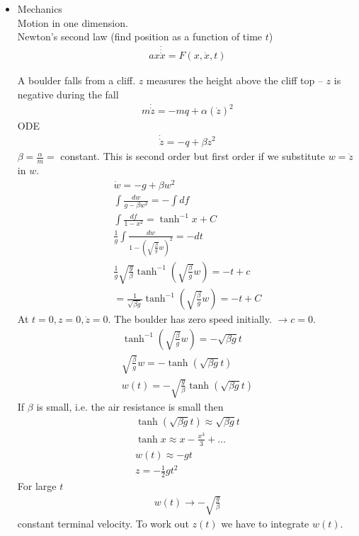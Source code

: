 \begin{itemize}
	\item 
	Mechanics \\
	Motion in one dimension. \\
	Newton's second law (find position as a function of time $t$)
	\begin{align*}
	ax \dot \dot \dot x = F(x, \dot x, t)
	\end{align*}
	\begin{ex}
		A boulder falls from a cliff.
		$z$ measures the height above the cliff top -- $z$ is negative during the fall
		\begin{align*}
		m \dot \dot z = - mq+\alpha (\dot z)^2
		\end{align*}
		ODE 
		\begin{align*}
		\dot \dot z = -q + \beta \dot z^2
		\end{align*}
		$\beta = \frac \alpha m =$ constant. This is second order but first order if we substitute $w=\dot z$ in $w$.
		\begin{align*}
			\dot w = -g + \beta w^2 \\
			\int \frac{dw}{g-\beta w^2} = - \int df \\
			\int \frac{df}{1-x^2} = \tanh^{-1} x +C \\
			\frac 1 g \int \frac{dw}{1- (\sqrt{\frac \beta g} w)^2} = -dt \\
			\frac 1 g \sqrt{\frac g \beta} \tanh^{-1}(\sqrt{\frac \beta g} w) = -t +c \\
			= \frac 1 {\sqrt{\beta g}} \tanh^{-1}(\sqrt{\frac \beta g} w) = -t+C
		\end{align*}
		At $t=0, z=0, \dot z = 0$. The boulder has zero speed initially. $\rightarrow c=0$.
		\begin{align*}
			\tanh^{-1} (\sqrt{\frac \beta g} w) = - \sqrt{\beta g} t \\
			\sqrt{\frac \beta g} w = - \tanh(\sqrt{\beta g} t) \\
			w(t) = - \sqrt{\frac g \beta} \tanh(\sqrt {\beta g} t )
		\end{align*}
		If $\beta$ is small, i.e. the air resistance is small then
		\begin{align*}
			\tanh(\sqrt{\beta g} t) \approx \sqrt{\beta g} t \\
			\tanh x \approx x - \frac{x^3}{3} + \dots \\
			w(t) \approx - gt \\
			z = - \frac 1 2 g t^2
		\end{align*}
		For large $t$
		\begin{align*}
			w(t) \rightarrow - \sqrt{\frac g \beta}
		\end{align*}
		constant terminal velocity.
		To work out $z(t)$ we have to integrate $w(t)$.
	\end{ex}
\end{itemize}





